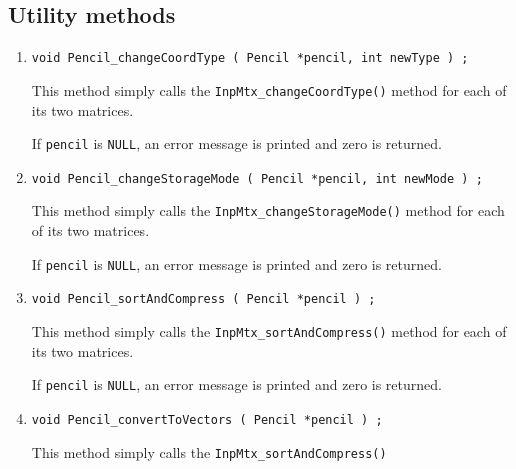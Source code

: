 \subsection{Utility methods}
\label{subsection:Pencil:proto:utilities}
\par
\begin{enumerate}
\item
\begin{verbatim}
void Pencil_changeCoordType ( Pencil *pencil, int newType ) ;
\end{verbatim}
This method simply calls the {\tt InpMtx\_changeCoordType()}
method for each of its two matrices.
\par {}
If {\tt pencil} is {\tt NULL},
an error message is printed and zero is returned.
\item
\begin{verbatim}
void Pencil_changeStorageMode ( Pencil *pencil, int newMode ) ;
\end{verbatim}
This method simply calls the {\tt InpMtx\_changeStorageMode()}
method for each of its two matrices.
\par {}
If {\tt pencil} is {\tt NULL},
an error message is printed and zero is returned.
\item
\begin{verbatim}
void Pencil_sortAndCompress ( Pencil *pencil ) ;
\end{verbatim}
This method simply calls the {\tt InpMtx\_sortAndCompress()}
method for each of its two matrices.
\par {}
If {\tt pencil} is {\tt NULL},
an error message is printed and zero is returned.
\item
\begin{verbatim}
void Pencil_convertToVectors ( Pencil *pencil ) ;
\end{verbatim}
This method simply calls the {\tt InpMtx\_sortAndCompress()}

\end{enumerate}

